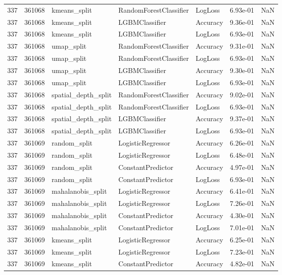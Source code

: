 \begin{tabular}{rrlllrr}
337 & 361068 & kmeans\_split & RandomForestClassifier & LogLoss & 6.93e-01 & NaN \\
337 & 361068 & kmeans\_split & LGBMClassifier & Accuracy & 9.36e-01 & NaN \\
337 & 361068 & kmeans\_split & LGBMClassifier & LogLoss & 6.93e-01 & NaN \\
337 & 361068 & umap\_split & RandomForestClassifier & Accuracy & 9.31e-01 & NaN \\
337 & 361068 & umap\_split & RandomForestClassifier & LogLoss & 6.93e-01 & NaN \\
337 & 361068 & umap\_split & LGBMClassifier & Accuracy & 9.30e-01 & NaN \\
337 & 361068 & umap\_split & LGBMClassifier & LogLoss & 6.93e-01 & NaN \\
337 & 361068 & spatial\_depth\_split & RandomForestClassifier & Accuracy & 9.02e-01 & NaN \\
337 & 361068 & spatial\_depth\_split & RandomForestClassifier & LogLoss & 6.93e-01 & NaN \\
337 & 361068 & spatial\_depth\_split & LGBMClassifier & Accuracy & 9.37e-01 & NaN \\
337 & 361068 & spatial\_depth\_split & LGBMClassifier & LogLoss & 6.93e-01 & NaN \\
337 & 361069 & random\_split & LogisticRegressor & Accuracy & 6.26e-01 & NaN \\
337 & 361069 & random\_split & LogisticRegressor & LogLoss & 6.48e-01 & NaN \\
337 & 361069 & random\_split & ConstantPredictor & Accuracy & 4.97e-01 & NaN \\
337 & 361069 & random\_split & ConstantPredictor & LogLoss & 6.93e-01 & NaN \\
337 & 361069 & mahalanobis\_split & LogisticRegressor & Accuracy & 6.41e-01 & NaN \\
337 & 361069 & mahalanobis\_split & LogisticRegressor & LogLoss & 7.26e-01 & NaN \\
337 & 361069 & mahalanobis\_split & ConstantPredictor & Accuracy & 4.30e-01 & NaN \\
337 & 361069 & mahalanobis\_split & ConstantPredictor & LogLoss & 7.01e-01 & NaN \\
337 & 361069 & kmeans\_split & LogisticRegressor & Accuracy & 6.25e-01 & NaN \\
337 & 361069 & kmeans\_split & LogisticRegressor & LogLoss & 7.23e-01 & NaN \\
337 & 361069 & kmeans\_split & ConstantPredictor & Accuracy & 4.82e-01 & NaN \\

\end{tabular}
